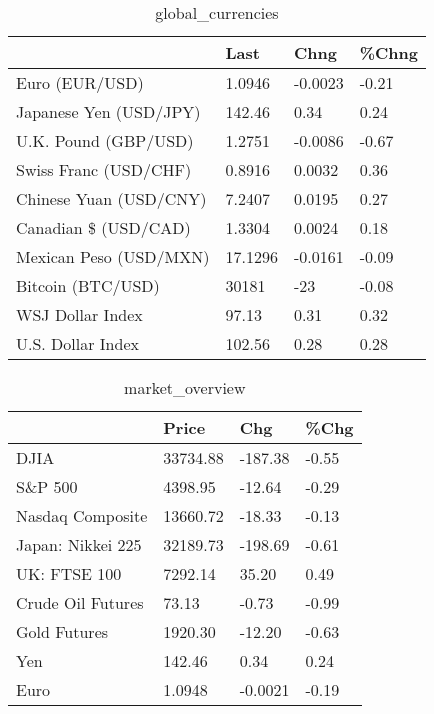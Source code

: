\documentclass{article}%
\begin{document}
%


\begin{table}[htbp]%
\caption{global\_currencies}%
\centering%
\begin{adjustbox}{width=1\textwidth}%
\begin{tabular}{llll}
\toprule
                       &    Last &    Chng & \%Chng \\
\midrule
        Euro (EUR/USD) &  1.0946 & -0.0023 & -0.21 \\
Japanese Yen (USD/JPY) &  142.46 &    0.34 &  0.24 \\
  U.K. Pound (GBP/USD) &  1.2751 & -0.0086 & -0.67 \\
 Swiss Franc (USD/CHF) &  0.8916 &  0.0032 &  0.36 \\
Chinese Yuan (USD/CNY) &  7.2407 &  0.0195 &  0.27 \\
  Canadian \$ (USD/CAD) &  1.3304 &  0.0024 &  0.18 \\
Mexican Peso (USD/MXN) & 17.1296 & -0.0161 & -0.09 \\
     Bitcoin (BTC/USD) &   30181 &     -23 & -0.08 \\
      WSJ Dollar Index &   97.13 &    0.31 &  0.32 \\
     U.S. Dollar Index &  102.56 &    0.28 &  0.28 \\
\bottomrule
\end{tabular}
%
\end{adjustbox}%
\end{table}

%


\begin{table}[htbp]%
\caption{market\_overview}%
\centering%
\begin{adjustbox}{width=1\textwidth}%
\begin{tabular}{llll}
\toprule
                  &    Price &     Chg &  \%Chg \\
\midrule
             DJIA & 33734.88 & -187.38 & -0.55 \\
          S\&P 500 &  4398.95 &  -12.64 & -0.29 \\
 Nasdaq Composite & 13660.72 &  -18.33 & -0.13 \\
Japan: Nikkei 225 & 32189.73 & -198.69 & -0.61 \\
     UK: FTSE 100 &  7292.14 &   35.20 &  0.49 \\
Crude Oil Futures &    73.13 &   -0.73 & -0.99 \\
     Gold Futures &  1920.30 &  -12.20 & -0.63 \\
              Yen &   142.46 &    0.34 &  0.24 \\
             Euro &   1.0948 & -0.0021 & -0.19 \\
\bottomrule
\end{tabular}
%
\end{adjustbox}%
\end{table}

%
\end{document}
